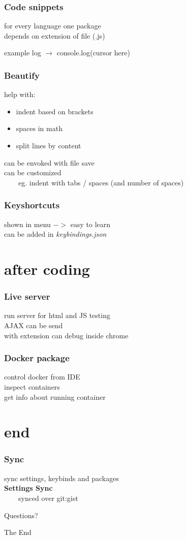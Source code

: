 \documentclass{beamer}
\begin{document}
\begin{frame}
\frametitle{Code snippets}
for every language one package\\
depends on extension of file (.js)
\begin{block}{example}
    log $\rightarrow$ console.log(cursor here)
\end{block}
\end{frame}

\begin{frame}
\frametitle{Beautify}
help with:
\begin{itemize}
\item indent based on brackets
\item spaces in math
\item split lines by content
\end{itemize}
can be envoked with file save\\
can be customized\\
~~~~eg. indent with tabs / spaces (and number of spaces)
\end{frame}

\begin{frame}
\frametitle{Keyshortcuts}
shown in menu $->$ easy to learn\\
can be added in \textit{keybindings.json}
\end{frame}

\section{after coding}
\begin{frame}
\frametitle{Live server}
run server for html and JS testing\\
AJAX can be send\\
with extension can debug inside chrome
\end{frame}

\begin{frame}
\frametitle{Docker package}
control docker from IDE\\
inspect containers\\
get info about running container
\end{frame}


\section{end}
\begin{frame}
\frametitle{Sync}
sync settings, keybinds and packages\\
\textbf{Settings Sync}\\
~~~~synced over git:gist
\end{frame}

\begin{frame}
\Huge{\centerline{Questions?}}
\end{frame}

\begin{frame}
\Huge{\centerline{The End}}
\end{frame}
\end{document}
